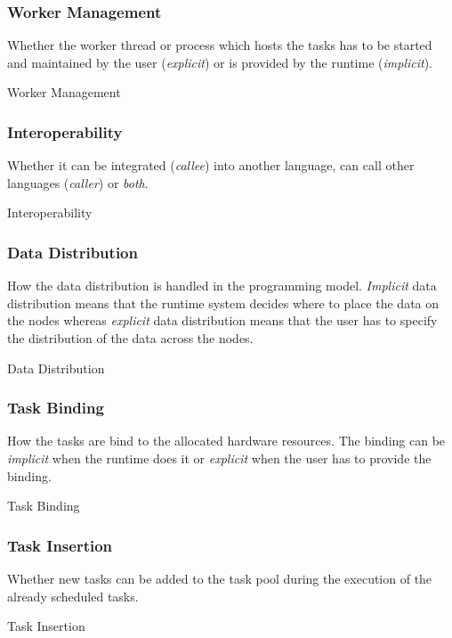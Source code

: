 \subsubsection{Worker Management}
Whether the worker thread or process which hosts the tasks has to be started and maintained by the user (\textit{explicit}) or is provided by the runtime (\textit{implicit}).
\begin{table}[H]
	\caption{Worker Management}
	\centering
	
\end{table}

\subsubsection{Interoperability}
Whether it can be integrated (\textit{callee}) into another language, can call other languages (\textit{caller}) or \textit{both}.
\begin{table}[H]
	\caption{Interoperability}
	\centering
	
\end{table}

\subsubsection{Data Distribution}
How the data distribution is handled in the programming model.
\textit{Implicit} data distribution means that the runtime system decides where to place the data on the nodes whereas \textit{explicit} data distribution means that the user has to specify the distribution of the data across the nodes.
\begin{table}[H]
	\caption{Data Distribution}
	\centering
	
\end{table}

\subsubsection{Task Binding}
How the tasks are bind to the allocated hardware resources.
The binding can be \textit{implicit} when the runtime does it or \textit{explicit} when the user has to provide the binding.
\begin{table}[H]
	\caption{Task Binding}
	\centering
	
\end{table}

\subsubsection{Task Insertion}
Whether new tasks can be added to the task pool during the execution of the already scheduled tasks.
\begin{table}[H]
	\caption{Task Insertion}
	\centering
	
\end{table}

